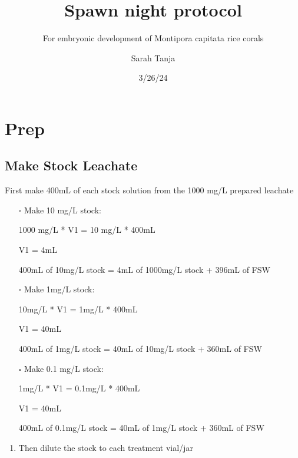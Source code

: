 \documentclass[
  letterpaper,
  DIV=11,
  numbers=noendperiod]{scrartcl}
\title{Spawn night protocol}
\subtitle{For embryonic development of Montipora capitata rice corals}
\author{Sarah Tanja}
\date{3/26/24}
\providecommand{\tightlist}{%
  \setlength{\itemsep}{0pt}\setlength{\parskip}{0pt}}\usepackage{longtable,booktabs,array}
\renewcommand*\contentsname{Table of contents}
\newcommand\contentsname{Table of contents}
\begin{document}
\maketitle
\ifdefined\Shaded\renewenvironment{Shaded}{\begin{tcolorbox}[sharp corners, breakable, borderline west={3pt}{0pt}{shadecolor}, enhanced, interior hidden, frame hidden, boxrule=0pt]}{\end{tcolorbox}}\fi

\renewcommand*\contentsname{Table of contents}
{
\hypersetup{linkcolor=}
\setcounter{tocdepth}{3}
\tableofcontents
}
\hypertarget{prep}{%
\section{Prep}\label{prep}}

\hypertarget{make-stock-leachate}{%
\subsection{Make Stock Leachate}\label{make-stock-leachate}}

First make 400mL of each stock solution from the 1000 mg/L prepared
leachate

\begin{itemize}
\item[$\square$]
  Make 10 mg/L stock:

  1000 mg/L * V1 = 10 mg/L * 400mL

  V1 = 4mL

  400mL of 10mg/L stock = 4mL of 1000mg/L stock + 396mL of FSW
\item[$\square$]
  Make 1mg/L stock:

  10mg/L * V1 = 1mg/L * 400mL

  V1 = 40mL

  400mL of 1mg/L stock = 40mL of 10mg/L stock + 360mL of FSW
\item[$\square$]
  Make 0.1 mg/L stock:

  1mg/L * V1 = 0.1mg/L * 400mL

  V1 = 40mL

  400mL of 0.1mg/L stock = 40mL of 1mg/L stock + 360mL of FSW
\end{itemize}

\begin{enumerate}
\def\labelenumi{\arabic{enumi}.}
\setcounter{enumi}{1}
\tightlist
\item
  Then dilute the stock to each treatment vial/jar
\end{enumerate}
\end{document}
